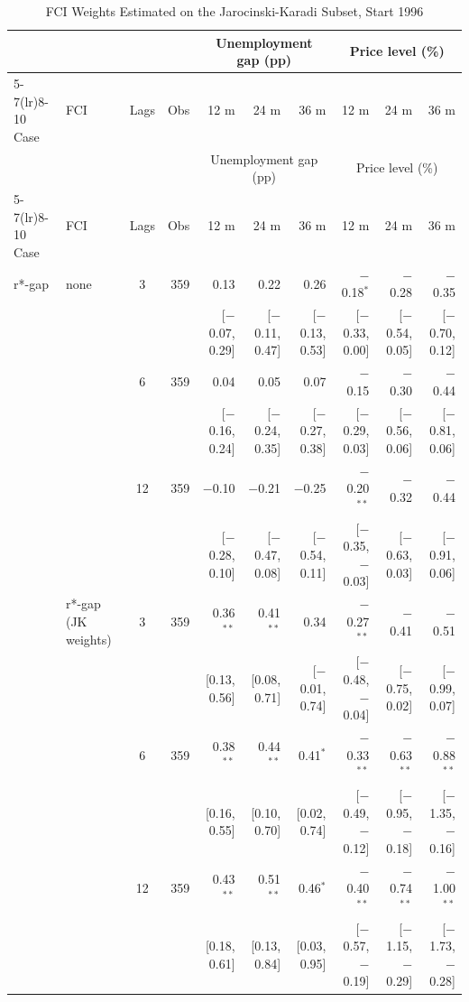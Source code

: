 \begingroup\scriptsize\setlength{\tabcolsep}{0.9pt}
\begin{longtable}{llcrrrrrrr}
\caption{FCI Weights Estimated on the Jarocinski-Karadi Subset, Start 1996}\label{tab:appR5c}\\
\toprule
 & & & & \multicolumn{3}{c}{Unemployment gap (pp)} & \multicolumn{3}{c}{Price level (\%)}\\ \cmidrule(lr){5-7}\cmidrule(lr){8-10}
Case & FCI & Lags & Obs & 12 m & 24 m & 36 m & 12 m & 24 m & 36 m\\
\midrule\endfirsthead
\toprule
 & & & & \multicolumn{3}{c}{Unemployment gap (pp)} & \multicolumn{3}{c}{Price level (\%)}\\ \cmidrule(lr){5-7}\cmidrule(lr){8-10}
Case & FCI & Lags & Obs & 12 m & 24 m & 36 m & 12 m & 24 m & 36 m\\
\midrule\endhead
\bottomrule\endfoot
r*-gap & none & 3 & 359 & 0.13 & 0.22 & 0.26 & $-$0.18$^{*}$ & $-$0.28 & $-$0.35\\
 & & & & {\scriptsize [$-$0.07, 0.29]} & {\scriptsize [$-$0.11, 0.47]} & {\scriptsize [$-$0.13, 0.53]} & {\scriptsize [$-$0.33, 0.00]} & {\scriptsize [$-$0.54, 0.05]} & {\scriptsize [$-$0.70, 0.12]}\\
 &  & 6 & 359 & 0.04 & 0.05 & 0.07 & $-$0.15 & $-$0.30 & $-$0.44\\
 & & & & {\scriptsize [$-$0.16, 0.24]} & {\scriptsize [$-$0.24, 0.35]} & {\scriptsize [$-$0.27, 0.38]} & {\scriptsize [$-$0.29, 0.03]} & {\scriptsize [$-$0.56, 0.06]} & {\scriptsize [$-$0.81, 0.06]}\\
 &  & 12 & 359 & $-$0.10 & $-$0.21 & $-$0.25 & $-$0.20$^{**}$ & $-$0.32 & $-$0.44\\
 & & & & {\scriptsize [$-$0.28, 0.10]} & {\scriptsize [$-$0.47, 0.08]} & {\scriptsize [$-$0.54, 0.11]} & {\scriptsize [$-$0.35, $-$0.03]} & {\scriptsize [$-$0.63, 0.03]} & {\scriptsize [$-$0.91, 0.06]}\\
 & r*-gap (JK weights) & 3 & 359 & 0.36$^{**}$ & 0.41$^{**}$ & 0.34 & $-$0.27$^{**}$ & $-$0.41 & $-$0.51\\
 & & & & {\scriptsize [0.13, 0.56]} & {\scriptsize [0.08, 0.71]} & {\scriptsize [$-$0.01, 0.74]} & {\scriptsize [$-$0.48, $-$0.04]} & {\scriptsize [$-$0.75, 0.02]} & {\scriptsize [$-$0.99, 0.07]}\\
 &  & 6 & 359 & 0.38$^{**}$ & 0.44$^{**}$ & 0.41$^{*}$ & $-$0.33$^{**}$ & $-$0.63$^{**}$ & $-$0.88$^{**}$\\
 & & & & {\scriptsize [0.16, 0.55]} & {\scriptsize [0.10, 0.70]} & {\scriptsize [0.02, 0.74]} & {\scriptsize [$-$0.49, $-$0.12]} & {\scriptsize [$-$0.95, $-$0.18]} & {\scriptsize [$-$1.35, $-$0.16]}\\
 &  & 12 & 359 & 0.43$^{**}$ & 0.51$^{**}$ & 0.46$^{*}$ & $-$0.40$^{**}$ & $-$0.74$^{**}$ & $-$1.00$^{**}$\\
 & & & & {\scriptsize [0.18, 0.61]} & {\scriptsize [0.13, 0.84]} & {\scriptsize [0.03, 0.95]} & {\scriptsize [$-$0.57, $-$0.19]} & {\scriptsize [$-$1.15, $-$0.29]} & {\scriptsize [$-$1.73, $-$0.28]}\\
\end{longtable}

